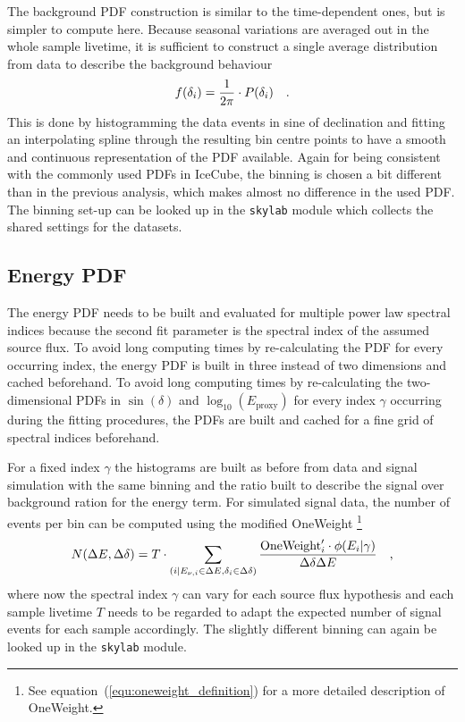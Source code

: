 The background PDF construction is similar to the time-dependent ones, but is simpler to compute here.
Because seasonal variations are averaged out in the whole sample livetime, it is sufficient to construct a single average distribution from data to describe the background behaviour
\begin{equation}
  f(\delta_i) = \frac{1}{2\pi}\cdot P(\delta_i)
  \quad\text{.}
\end{equation}
This is done by histogramming the data events in sine of declination and fitting an interpolating spline through the resulting bin centre points to have a smooth and continuous representation of the PDF available.
Again for being consistent with the commonly used PDFs in IceCube, the binning is chosen a bit different than in the previous analysis, which makes almost no difference in the used PDF.
The binning set-up can be looked up in the \lstinline!skylab! module which collects the shared settings for the datasets.

\subsection*{Energy PDF}
The energy PDF needs to be built and evaluated for multiple power law spectral indices because the second fit parameter is the spectral index of the assumed source flux.
To avoid long computing times by re-calculating the PDF for every occurring index, the energy PDF is built in three instead of two dimensions and cached beforehand.
To avoid long computing times by re-calculating the two-dimensional PDFs in $\sin(\delta)$ and $\log_{10}\left(E_\text{proxy}\right)$ for every index $\gamma$ occurring during the fitting procedures, the PDFs are built and cached for a fine grid of spectral indices beforehand.

For a fixed index $\gamma$ the histograms are built as before from data and signal simulation with the same binning and the ratio built to describe the signal over background ration for the energy term.
For simulated signal data, the number of events per bin can be computed using the modified OneWeight \footnote{See equation~(\ref{equ:oneweight_definition}) for a more detailed description of OneWeight.}
\begin{equation}
  N(\Delta E, \Delta\delta)
  = T\cdot \sum_{(i|E_{\nu,i}\in\Delta E, \delta_i\in\Delta\delta)}
    \frac{\text{OneWeight}'_i \cdot \phi(E_i|\gamma)}{\Delta\delta \Delta E}
  \quad\text{,}
\end{equation}
where now the spectral index $\gamma$ can vary for each source flux hypothesis and each sample livetime $T$ needs to be regarded to adapt the expected number of signal events for each sample accordingly.
The slightly different binning can again be looked up in the \lstinline!skylab! module.

